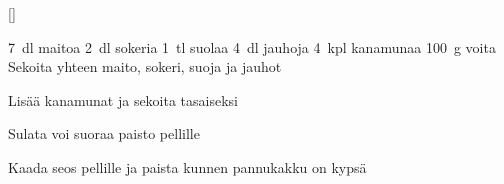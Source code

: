 []


\begin{step}
  7~dl maitoa
  2~dl sokeria
  1~tl suolaa
  4~dl jauhoja
  4~kpl kanamunaa
  100~g voita
  \method
  Sekoita yhteen maito, sokeri, suoja ja jauhot

  Lisää kanamunat ja sekoita tasaiseksi

  Sulata voi suoraa paisto pellille

  Kaada seos pellille ja paista  kunnen pannukakku on kypsä
\end{step}
